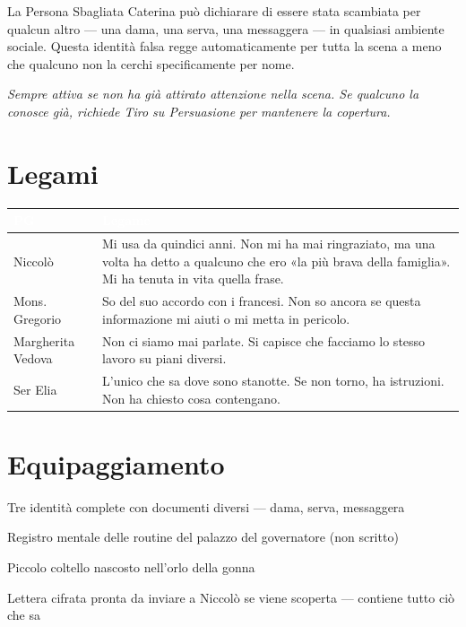 
\begin{fieschibox}{La Persona Sbagliata}
  Caterina può dichiarare di essere stata scambiata per qualcun altro —
  una dama, una serva, una messaggera — in qualsiasi ambiente sociale.
  Questa identità falsa regge automaticamente per tutta la scena a meno
  che qualcuno non la cerchi specificamente per nome.

  \medskip\noindent\textit{Sempre attiva se non ha già attirato attenzione
  nella scena. Se qualcuno la conosce già, richiede Tiro su Persuasione
  per mantenere la copertura.}
\end{fieschibox}

\section*{Legami}

\begin{table}[h]
\centering\renewcommand{\arraystretch}{1.4}
\begin{tabularx}{\linewidth}{@{}L{2.6cm} X@{}}
  \toprule{}
  \textcolor{white}{\textbf{PG}} & \textcolor{white}{\textbf{Legame}} \\
  \midrule
  Niccolò & Mi usa da quindici anni. Non mi ha mai ringraziato, ma una volta
           ha detto a qualcuno che ero «la più brava della famiglia».
           Mi ha tenuta in vita quella frase. \\
  Mons. Gregorio & So del suo accordo con i francesi. Non so ancora se
                  questa informazione mi aiuti o mi metta in pericolo. \\
  Margherita Vedova & Non ci siamo mai parlate. Si capisce che facciamo
                     lo stesso lavoro su piani diversi. \\
  Ser Elia & L'unico che sa dove sono stanotte. Se non torno, ha istruzioni.
            Non ha chiesto cosa contengano. \\
  \bottomrule
\end{tabularx}
\end{table}

\section*{Equipaggiamento}
\begin{goldlist}
  \item Tre identità complete con documenti diversi — dama, serva, messaggera
  \item Registro mentale delle routine del palazzo del governatore (non scritto)
  \item Piccolo coltello nascosto nell'orlo della gonna
  \item Lettera cifrata pronta da inviare a Niccolò se viene scoperta — contiene tutto ciò che sa
\end{goldlist}

